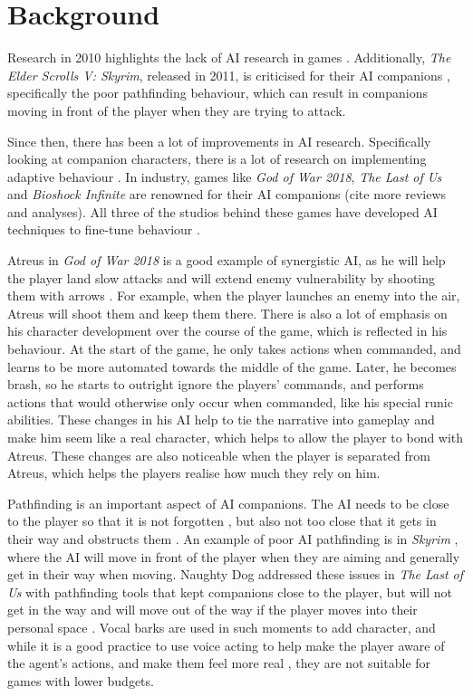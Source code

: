 \documentclass{IEEEtran}
\begin{document}
\section{Background}
\label{Background}

Research in 2010 highlights the lack of AI research in games \cite{RealTimeAICritique2010}. Additionally, \textit{The Elder Scrolls V: Skyrim}, released in 2011, is criticised for their AI companions \cite{tremblay2013adaptive}, specifically the poor pathfinding behaviour, which can result in companions moving in front of the player when they are trying to attack.

Since then, there has been a lot of improvements in AI research. Specifically looking at companion characters, there is a lot of research on implementing adaptive behaviour \cite{tremblay2013adaptive, CompanionBotsFPS2019, GeneratingCollabBehaviourPlanRecognition2016}. In industry, games like \textit{God of War 2018}, \textit{The Last of Us} and \textit{Bioshock Infinite} are renowned for their AI companions \cite{PlayDontShow} (cite more reviews and analyses). All three of the studios behind these games have developed AI techniques to fine-tune behaviour \cite{GDCAtreus, GAIP2EllieAI, GDCElizabeth, AIGamesBioshockAI}.

Atreus in \textit{God of War 2018} is a good example of synergistic AI, as he will help the player land slow attacks and will extend enemy vulnerability by shooting them with arrows \cite{GDCAtreus}. For example, when the player launches an enemy into the air, Atreus will shoot them and keep them there. There is also a lot of emphasis on his character development over the course of the game, which is reflected in his behaviour. At the start of the game, he only takes actions when commanded, and learns to be more automated towards the middle of the game. Later, he becomes brash, so he starts to outright ignore the players’ commands, and performs actions that would otherwise only occur when commanded, like his special runic abilities. These changes in his AI help to tie the narrative into gameplay and make him seem like a real character, which helps to allow the player to bond with Atreus. These changes are also noticeable when the player is separated from Atreus, which helps the players realise how much they rely on him.

Pathfinding is an important aspect of AI companions. The AI needs to be close to the player so that it is not forgotten \cite{GAIP2EllieAI}, but also not too close that it gets in their way and obstructs them \cite{CoupledEmpowermentMaximisation}. An example of poor AI pathfinding is in \textit{Skyrim} \cite{tremblay2013adaptive}, where the AI will move in front of the player when they are aiming and generally get in their way when moving. Naughty Dog addressed these issues in \textit{The Last of Us} with pathfinding tools that kept companions close to the player, but will not get in the way and will move out of the way if the player moves into their personal space \cite{GAIP2EllieAI}. Vocal barks are used in such moments to add character, and while it is a good practice to use voice acting to help make the player aware of the agent’s actions, and make them feel more real \cite{GMTGoodAI}, they are not suitable for games with lower budgets.
\end{document}
